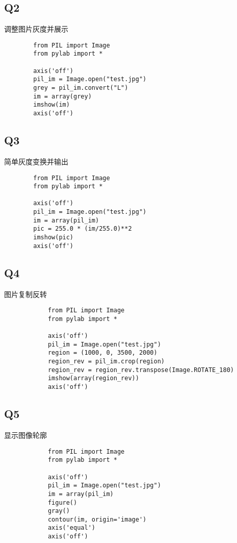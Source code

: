 \documentclass{article}
\begin{document}
    \subsection{Q2}
    调整图片灰度并展示
    \begin{verbatim}
        from PIL import Image
        from pylab import *

        axis('off')
        pil_im = Image.open("test.jpg")
        grey = pil_im.convert("L")
        im = array(grey)
        imshow(im)
        axis('off')
    \end{verbatim}

    \subsection{Q3}
    简单灰度变换并输出
    \begin{verbatim}
        from PIL import Image
        from pylab import *

        axis('off')
        pil_im = Image.open("test.jpg")
        im = array(pil_im)
        pic = 255.0 * (im/255.0)**2
        imshow(pic)
        axis('off')
    \end{verbatim}

    \subsection{Q4}
    图片复制反转
        \begin{verbatim}
            from PIL import Image
            from pylab import *

            axis('off')
            pil_im = Image.open("test.jpg")
            region = (1000, 0, 3500, 2000)
            region_rev = pil_im.crop(region)
            region_rev = region_rev.transpose(Image.ROTATE_180)
            imshow(array(region_rev))
            axis('off')
        \end{verbatim}

        \subsection{Q5}
        显示图像轮廓
        \begin{verbatim}
            from PIL import Image
            from pylab import *

            axis('off')
            pil_im = Image.open("test.jpg")
            im = array(pil_im)
            figure()
            gray()
            contour(im, origin='image')
            axis('equal')
            axis('off')
        \end{verbatim}
\end{document}
